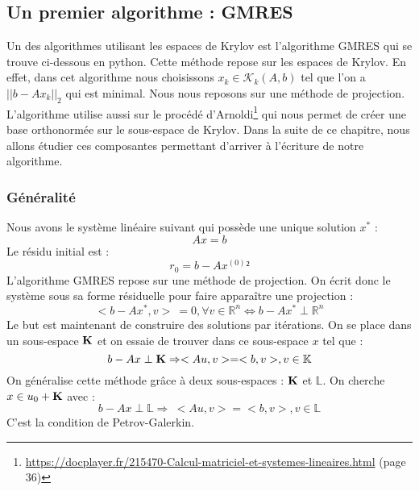 \subsection{Un premier algorithme : GMRES}
Un des algorithmes utilisant les espaces de Krylov est l'algorithme GMRES qui se trouve ci-dessous en python. Cette méthode repose sur les espaces de Krylov. En effet, dans cet algorithme nous choisissons $x_k \in \mathcal{K}_k(A, b)$ tel que l'on a $||b - Ax_k||_2$ qui est minimal. Nous nous reposons sur une méthode de projection. L'algorithme utilise aussi sur le procédé d'Arnoldi\footnote{\url{https://docplayer.fr/215470-Calcul-matriciel-et-systemes-lineaires.html} (page 36)} qui nous permet de créer une base orthonormée sur le sous-espace de Krylov. Dans la suite de ce chapitre, nous allons étudier ces composantes permettant d'arriver à l'écriture de notre algorithme.

\subsubsection{Généralité}
Nous avons le système linéaire suivant qui possède une unique solution $x^*$ : 
\begin{equation}
Ax = b
\end{equation}
Le résidu initial est  : 
\begin{equation}
r_0 = b - A x^{(0)}²
\end{equation}
L'algorithme GMRES repose sur une méthode de projection. On écrit donc le système sous sa forme résiduelle pour faire apparaître une projection : 
\begin{equation}
<b - Ax^*, v>\ = 0, \forall v \in \mathbb{R}^n \Leftrightarrow b - Ax^* \perp \mathbb{R}^n
\label{pb_res}
\end{equation}
Le but est maintenant de construire des solutions par itérations. On se place dans un sous-espace $\mathbf{K}$ et on essaie de trouver dans ce sous-espace $x$ tel que : 
\begin{equation}
b - Ax \perp \mathbf{K} \Rightarrow <Au, v> = <b, v>, v \in \mathbb{K}
\end{equation}
On généralise cette méthode grâce à deux sous-espaces : $\mathbf{K}$ et  $\mathbb{L}$. On cherche $x \in u_0 + \mathbf{K}$ avec :
\begin{equation}
b - Ax \perp \mathbb{L} \Rightarrow \ <Au, v> = <b, v>, v \in \mathbb{L}
\label{Petrov-Galerkin}
\end{equation}
C'est la condition de Petrov-Galerkin.

